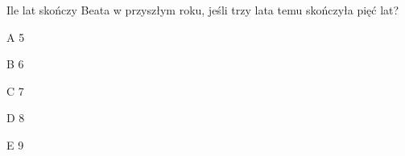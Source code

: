\begin{tresc}
Ile lat skończy Beata w przyszłym roku, jeśli trzy lata temu skończyła pięć lat?
\end{tresc}
\begin{wariant}{A} 5 \end{wariant}
\begin{wariant}{B} 6 \end{wariant}
\begin{wariant}{C} 7 \end{wariant}
\begin{wariant}{D} 8 \end{wariant}
\begin{wariant}{E} 9 \end{wariant}
